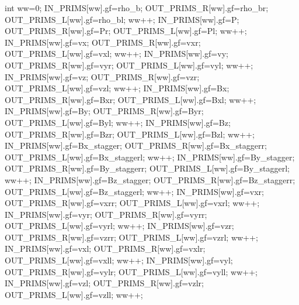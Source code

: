 \documentclass[landscape,letterpaper,10pt,english]{article}
\newenvironment{Shaded}{}{}
\newcommand{\DataTypeTok}[1]{\textcolor[rgb]{0.56,0.13,0.00}{{#1}}}
\newcommand{\DecValTok}[1]{\textcolor[rgb]{0.25,0.63,0.44}{{#1}}}
\newcommand{\NormalTok}[1]{{#1}}
\begin{document}
\begin{enumerate}
\begin{Shaded}
\begin{Highlighting}[]
\DataTypeTok{int}\NormalTok{ ww=}\DecValTok{0}\NormalTok{;}
\NormalTok{IN_PRIMS[ww].gf=rho_b;      OUT_PRIMS_R[ww].gf=rho_br;      OUT_PRIMS_L[ww].gf=rho_bl;      ww++;}
\NormalTok{IN_PRIMS[ww].gf=P;          OUT_PRIMS_R[ww].gf=Pr;          OUT_PRIMS_L[ww].gf=Pl;          ww++;}
\NormalTok{IN_PRIMS[ww].gf=vx;         OUT_PRIMS_R[ww].gf=vxr;         OUT_PRIMS_L[ww].gf=vxl;         ww++;}
\NormalTok{IN_PRIMS[ww].gf=vy;         OUT_PRIMS_R[ww].gf=vyr;         OUT_PRIMS_L[ww].gf=vyl;         ww++;}
\NormalTok{IN_PRIMS[ww].gf=vz;         OUT_PRIMS_R[ww].gf=vzr;         OUT_PRIMS_L[ww].gf=vzl;         ww++;}
\NormalTok{IN_PRIMS[ww].gf=Bx;         OUT_PRIMS_R[ww].gf=Bxr;         OUT_PRIMS_L[ww].gf=Bxl;         ww++;}
\NormalTok{IN_PRIMS[ww].gf=By;         OUT_PRIMS_R[ww].gf=Byr;         OUT_PRIMS_L[ww].gf=Byl;         ww++;}
\NormalTok{IN_PRIMS[ww].gf=Bz;         OUT_PRIMS_R[ww].gf=Bzr;         OUT_PRIMS_L[ww].gf=Bzl;         ww++;}
\NormalTok{IN_PRIMS[ww].gf=Bx_stagger; OUT_PRIMS_R[ww].gf=Bx_staggerr; OUT_PRIMS_L[ww].gf=Bx_staggerl; ww++;}
\NormalTok{IN_PRIMS[ww].gf=By_stagger; OUT_PRIMS_R[ww].gf=By_staggerr; OUT_PRIMS_L[ww].gf=By_staggerl; ww++;}
\NormalTok{IN_PRIMS[ww].gf=Bz_stagger; OUT_PRIMS_R[ww].gf=Bz_staggerr; OUT_PRIMS_L[ww].gf=Bz_staggerl; ww++;}
\NormalTok{IN_PRIMS[ww].gf=vxr;        OUT_PRIMS_R[ww].gf=vxrr;        OUT_PRIMS_L[ww].gf=vxrl;        ww++;}
\NormalTok{IN_PRIMS[ww].gf=vyr;        OUT_PRIMS_R[ww].gf=vyrr;        OUT_PRIMS_L[ww].gf=vyrl;        ww++;}
\NormalTok{IN_PRIMS[ww].gf=vzr;        OUT_PRIMS_R[ww].gf=vzrr;        OUT_PRIMS_L[ww].gf=vzrl;        ww++;}
\NormalTok{IN_PRIMS[ww].gf=vxl;        OUT_PRIMS_R[ww].gf=vxlr;        OUT_PRIMS_L[ww].gf=vxll;        ww++;}
\NormalTok{IN_PRIMS[ww].gf=vyl;        OUT_PRIMS_R[ww].gf=vylr;        OUT_PRIMS_L[ww].gf=vyll;        ww++;}
\NormalTok{IN_PRIMS[ww].gf=vzl;        OUT_PRIMS_R[ww].gf=vzlr;        OUT_PRIMS_L[ww].gf=vzll;        ww++;}
\end{Highlighting}
\end{Shaded}
\end{enumerate}
\end{document}
